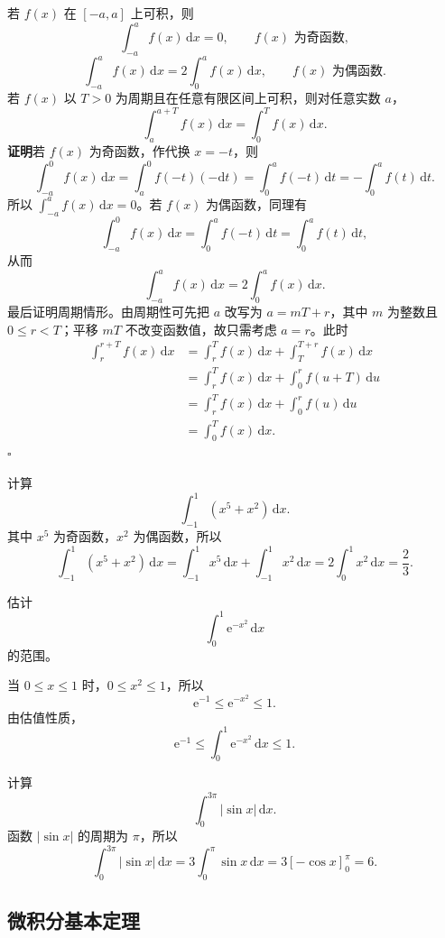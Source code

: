 \documentclass[fontset=fandol]{ctexart}
\newcommand{\dd}{\mathrm{d}}
\newcommand{\ee}{\mathrm{e}}
\begin{document}
\begin{proposition}[奇偶性与周期性]
若 $f(x)$ 在 $[-a,a]$ 上可积，则
\[
\int_{-a}^{a} f(x)\,\dd x=0,\qquad f(x)\text{ 为奇函数},
\]
\[
\int_{-a}^{a} f(x)\,\dd x=2\int_0^a f(x)\,\dd x,\qquad f(x)\text{ 为偶函数}.
\]
若 \(f(x)\) 以 \(T>0\) 为周期且在任意有限区间上可积，则对任意实数 \(a\)，
\[
\int_a^{a+T} f(x)\,\dd x=\int_0^T f(x)\,\dd x.
\]
\textbf{证明}\quad 若 $f(x)$ 为奇函数，作代换 $x=-t$，则
\[
\int_{-a}^{0}f(x)\,\dd x
=\int_a^0 f(-t)(-\dd t)
=\int_0^a f(-t)\,\dd t
=-\int_0^a f(t)\,\dd t.
\]
所以 $\int_{-a}^{a}f(x)\,\dd x=0$。若 $f(x)$ 为偶函数，同理有
\[
\int_{-a}^{0}f(x)\,\dd x
=\int_0^a f(-t)\,\dd t
=\int_0^a f(t)\,\dd t,
\]
从而
\[
\int_{-a}^{a}f(x)\,\dd x=2\int_0^a f(x)\,\dd x.
\]
最后证明周期情形。由周期性可先把 \(a\) 改写为 \(a=mT+r\)，其中 \(m\) 为整数且 \(0\leq r<T\)；平移 \(mT\) 不改变函数值，故只需考虑 \(a=r\)。此时
\[
\begin{aligned}
\int_r^{r+T}f(x)\,\dd x
&=\int_r^T f(x)\,\dd x+\int_T^{T+r}f(x)\,\dd x\\
&=\int_r^T f(x)\,\dd x+\int_0^r f(u+T)\,\dd u\\
&=\int_r^T f(x)\,\dd x+\int_0^r f(u)\,\dd u\\
&=\int_0^T f(x)\,\dd x.
\end{aligned}
\]
\noindent\hfill$\square$
\end{proposition}

\begin{example}[利用奇偶性]
计算
\[
\int_{-1}^{1}(x^5+x^2)\,\dd x.
\]
其中 $x^5$ 为奇函数，$x^2$ 为偶函数，所以
\[
\int_{-1}^{1}(x^5+x^2)\,\dd x
=\int_{-1}^{1}x^5\,\dd x+\int_{-1}^{1}x^2\,\dd x
=2\int_0^1x^2\,\dd x=\frac23.
\]
\end{example}

\begin{example}[估计积分]
估计
\[
\int_0^1 \ee^{-x^2}\,\dd x
\]
的范围。

当 $0\leq x\leq1$ 时，$0\leq x^2\leq1$，所以
\[
\ee^{-1}\leq \ee^{-x^2}\leq1.
\]
由估值性质，
\[
\ee^{-1}\leq \int_0^1 \ee^{-x^2}\,\dd x\leq1.
\]
\end{example}

\begin{example}[利用周期性]
计算
\[
\int_0^{3\pi}|\sin x|\,\dd x.
\]
函数 $|\sin x|$ 的周期为 $\pi$，所以
\[
\int_0^{3\pi}|\sin x|\,\dd x
=3\int_0^\pi \sin x\,\dd x
=3\left[-\cos x\right]_0^\pi=6.
\]
\end{example}

\subsection{微积分基本定理}
\end{document}
